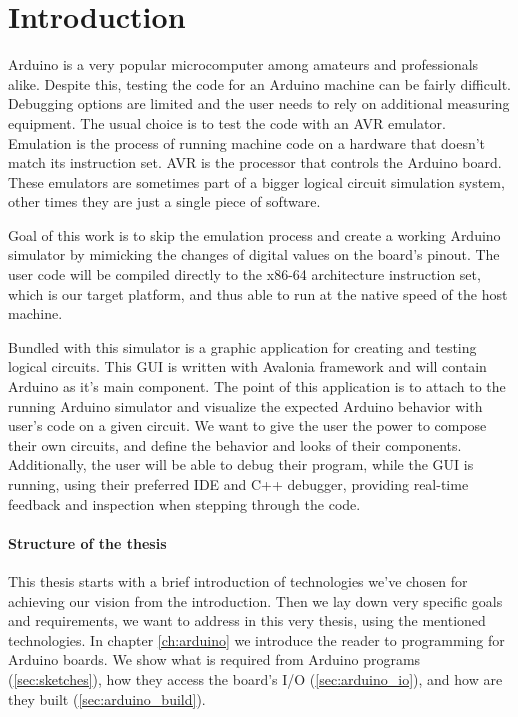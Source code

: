 \chapter*{Introduction}

Arduino is a very popular microcomputer among amateurs and professionals alike. Despite this, testing the code for an Arduino machine can be fairly difficult. Debugging options are limited and the user needs to rely on additional measuring equipment. The usual choice is to test the code with an AVR emulator. Emulation is the process of running machine code on a hardware that doesn't match its instruction set. AVR is the processor that controls the Arduino board. These emulators are sometimes part of a bigger logical circuit simulation system, other times they are just a single piece of software.

Goal of this work is to skip the emulation process and create a working Arduino simulator by mimicking the changes of digital values on the board's pinout. The user code will be compiled directly to the x86-64 architecture instruction set, which is our target platform, and thus able to run at the native speed of the host machine.

Bundled with this simulator is a graphic application for creating and testing logical circuits. This GUI is written with Avalonia framework and will contain Arduino as it's main component. The point of this application is to attach to the running Arduino simulator and visualize the expected Arduino behavior with user's code on a given circuit. We want to give the user the power to compose their own circuits, and define the behavior and looks of their components. Additionally, the user will be able to debug their program, while the GUI is running, using their preferred IDE and C++ debugger, providing real-time feedback and inspection when stepping through the code.

\subsubsection{Structure of the thesis}

This thesis starts with a brief introduction of technologies we've chosen for achieving our vision from the introduction. Then we lay down very specific goals and requirements, we want to address in this very thesis, using the mentioned technologies. In chapter \ref{ch:arduino} we introduce the reader to programming for Arduino boards. We show what is required from Arduino programs (\ref{sec:sketches}), how they access the board's I/O (\ref{sec:arduino_io}), and how are they built (\ref{sec:arduino_build}).

